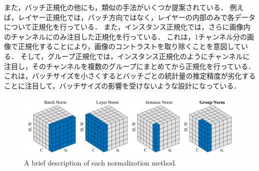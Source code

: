     また，バッチ正規化の他にも，類似の手法がいくつか提案されている．
    例えば，レイヤー正規化\cite{ba2016layer}では，バッチ方向ではなく，レイヤーの内部のみで各データについて正規化を行っている．
    また，インスタンス正規化\cite{ulyanov2016instance}では，さらに画像内のチャンネルにのみ注目した正規化を行っている．
    これは，1チャンネル分の画像で正規化することにより，画像のコントラストを取り除くことを意図している．
    そして，グループ正規化\cite{wu2018group}では，インスタンス正規化のようにチャンネルに注目し，そのチャンネルを複数のグループにまとめてから正規化を行っている．
    これは，バッチサイズを小さくするとバッチごとの統計量の推定精度が劣化することに注目して，バッチサイズの影響を受けないような設計になっている．
    \begin{figure}[ht]
        \begin{center}
            \includegraphics[width=15cm]{./8_appendix/img/batchnorm_description}
            \caption{A brief description of each normalization method\cite{wu2018group}.}
        \end{center}
    \end{figure}

